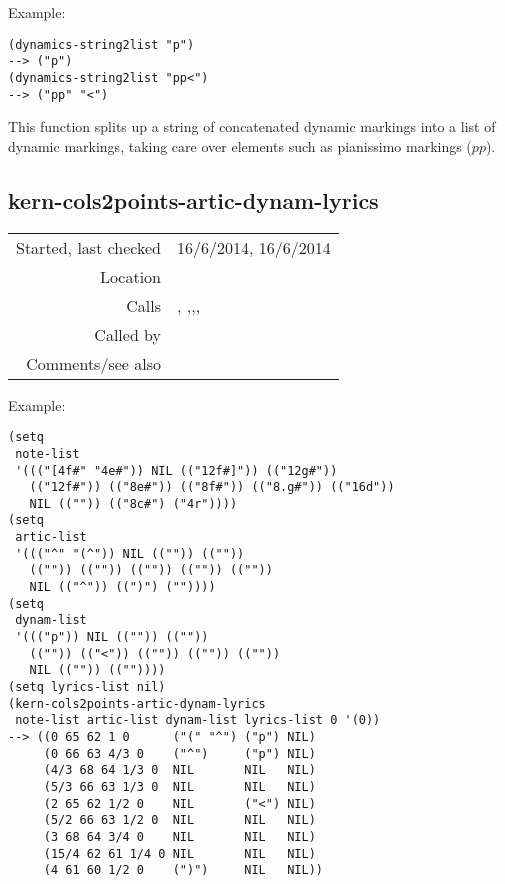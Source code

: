 \vspace{0.5cm}
\noindent Example:
\begin{verbatim}
(dynamics-string2list "p")
--> ("p")
(dynamics-string2list "pp<")
--> ("pp" "<")
\end{verbatim}

\noindent This function splits up a string of
concatenated dynamic markings into a list of dynamic
markings, taking care over elements such as pianissimo
markings ($pp$).


\subsection*{kern-cols2points-artic-dynam-lyrics}\label{fun:kern-cols2points-artic-dynam-lyrics}

\vspace{0.3cm}
\begin{tabular}{r|p{8cm}}
Started, last checked & 16/6/2014, 16/6/2014 \\
Location & \nameref{sec:kern-articulation} \\
Calls & \nameref{fun:append-list}, \nameref{fun:constant-vector},\newline \nameref{fun:parse-kern-notes-artic-dynam-lyrics},\newline \nameref{fun:resolve-ties-kern}, \nameref{fun:return-lists-of-length-n} \\
Called by & \nameref{fun:kern-file2points-artic-dynam-lyrics} \\
Comments/see also &
\end{tabular}

\vspace{0.5cm}
\noindent Example:
\begin{verbatim}
(setq
 note-list
 '((("[4f#" "4e#")) NIL (("12f#]")) (("12g#"))
   (("12f#")) (("8e#")) (("8f#")) (("8.g#")) (("16d"))
   NIL (("")) (("8c#") ("4r"))))
(setq
 artic-list
 '((("^" "(^")) NIL (("")) ((""))
   (("")) (("")) (("")) (("")) ((""))
   NIL (("^")) ((")") (""))))
(setq
 dynam-list
 '((("p")) NIL (("")) ((""))
   (("")) (("<")) (("")) (("")) ((""))
   NIL (("")) ((""))))
(setq lyrics-list nil)
(kern-cols2points-artic-dynam-lyrics
 note-list artic-list dynam-list lyrics-list 0 '(0))
--> ((0 65 62 1 0      ("(" "^") ("p") NIL)
     (0 66 63 4/3 0    ("^")     ("p") NIL)
     (4/3 68 64 1/3 0  NIL       NIL   NIL)
     (5/3 66 63 1/3 0  NIL       NIL   NIL)
     (2 65 62 1/2 0    NIL       ("<") NIL)
     (5/2 66 63 1/2 0  NIL       NIL   NIL)
     (3 68 64 3/4 0    NIL       NIL   NIL)
     (15/4 62 61 1/4 0 NIL       NIL   NIL)
     (4 61 60 1/2 0    (")")     NIL   NIL))
\end{verbatim}

